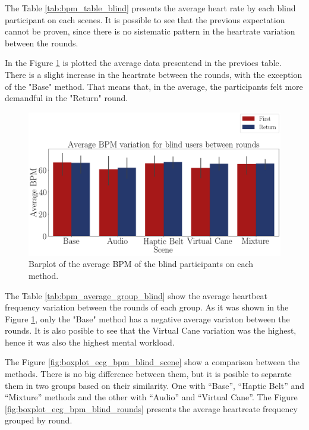 The Table \ref{tab:bpm_table_blind} presents the average heart rate by each blind participant on each scenes. It is possible to see that the previous expectation cannot be proven, since there is no sistematic pattern in the heartrate variation between the rounds.



In the Figure \ref{fig:barplot_ecg_bpm_5_scene_blind} is plotted the average data presentend in the previoes table. There is a slight increase in the heartrate between the rounds, with the exception of the "Base" method. That means that, in the average, the participants felt more demandful in the "Return" round.

\begin{figure}[!htb]
    \centering
    \includegraphics[width = 0.8\linewidth]{Resultados/ECG/Figuras/png/barplot_ecg_bpm_5_scene_blind.png}
    \caption{Barplot of the average BPM of the blind participants on each method.}
    \label{fig:barplot_ecg_bpm_5_scene_blind}
\end{figure}

The Table \ref{tab:bpm_average_group_blind} show the average heartbeat frequency variation between the rounds of each group. As it was shown in the Figure \ref{fig:barplot_ecg_bpm_5_scene_blind}, only the "Base" method has a negative average variaton between the rounds. It is also posible to see that the Virtual Cane variation was the highest, hence it was also the highest mental workload.
 


The Figure \ref{fig:boxplot_ecg_bpm_blind_scene} show a comparison between the methods. There is no big difference between them, but it is posible to 
separate them in two groups based on their similarity. One with “Base”, “Haptic Belt” and “Mixture” methods and the other with “Audio” and “Virtual Cane”. The Figure \ref{fig:boxplot_ecg_bpm_blind_rounds} presents the average heartreate frequency grouped by round.

